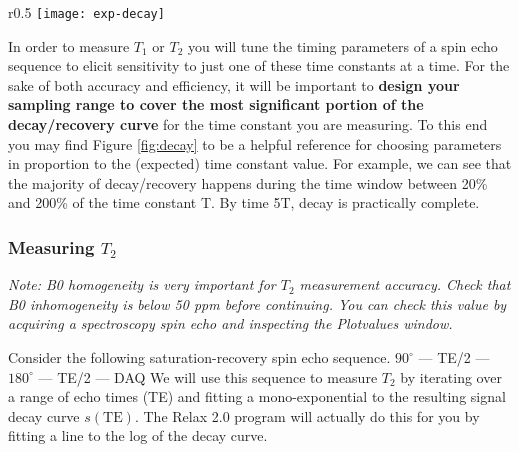 \vspace{5mm}

\begin{wrapfigure}{r}{0.5\textwidth}
    \vspace{-5mm}
    \centering
    \texttt{[image: exp-decay]}
    \captionsetup{width=0.4\textwidth}
    \caption{\label{fig:decay} Exponential decay with a generic time constant $T$. This plot can be a helpful reference for designing relaxometry experiments.}
\end{wrapfigure}

In order to measure $T_1$ or $T_2$ you will tune the timing parameters of a spin echo sequence to elicit sensitivity to just one of these time constants at a time. For the sake of both accuracy and efficiency, it will be important to \textbf{design your sampling range to cover the most significant portion of the decay/recovery curve} for the time constant you are measuring. To this end you may find Figure \ref{fig:decay} to be a helpful reference for choosing parameters in proportion to the (expected) time constant value. For example, we can see that the majority of decay/recovery happens during the time window between 20\% and 200\% of the time constant T. By time 5T, decay is practically complete.

\newpage
\subsubsection{Measuring $T_2$} \label{sec:T2}

\emph{Note: B0 homogeneity is very important for $T_2$ measurement accuracy. Check that B0 inhomogeneity is below 50 ppm before continuing. You can check this value by acquiring a spectroscopy spin echo and inspecting the Plotvalues window.}

\vspace{5mm}
Consider the following saturation-recovery spin echo sequence.
\newline \newline
$90^{\circ}$ --- TE/2 --- $180^{\circ}$ --- TE/2 --- DAQ
\newline \newline
We will use this sequence to measure $T_2$ by iterating over a range of echo times (TE) and fitting a mono-exponential to the resulting signal decay curve $s(\text{TE})$. The Relax 2.0 program will actually do this for you by fitting a line to the log of the decay curve.
\vspace{5mm}

